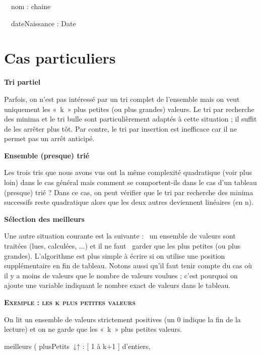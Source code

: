 {\sffamily
\ \ nom : chaine}

{\sffamily
\ \ dateNaissance : Date}

{\sffamily
{} }


\bigskip

\section{Cas particuliers}
{\sffamily\bfseries\upshape
Tri partiel}

{
Parfois, on n’est pas intéressé par un tri complet de l’ensemble mais on
veut uniquement les «~k~» plus petites (ou plus grandes) valeurs. Le
tri par recherche des minima et le tri bulle sont particulièrement
adaptés à cette situation ; il suffit de les arrêter plus tôt. Par
contre, le tri par insertion est inefficace car il ne permet pas un
arrêt anticipé.}

{\sffamily\bfseries\upshape
Ensemble (presque) trié}

{
Les trois tris que nous avons vus ont la même complexité quadratique
(voir plus loin) dans le cas général mais comment se comportent-ils
dans le cas d’un tableau (presque) trié ? Dans ce cas, on peut vérifier
que le tri par recherche des minima successifs reste quadratique alors
que les deux autres deviennent linéaires (en n).}

{\sffamily\bfseries\upshape
Sélection des meilleurs}

{
Une autre situation courante est la suivante : \ un ensemble de valeurs
sont traitées (lues, calculées, ...) et il ne faut \ garder que les
 plus petites (ou plus grandes).
L'algorithme est plus simple à écrire si on utilise
une position supplémentaire en fin de tableau. Notons aussi qu’il faut
tenir compte du cas où il y a moins de valeurs que le nombre de valeurs
voulues ; c’est pourquoi on ajoute une variable indiquant le nombre
exact de valeurs dans le tableau.}

{\sffamily\bfseries\scshape
Exemple : les k plus petites valeurs}

{
On lit un ensemble de valeurs strictement positives (un 0 indique la fin
de la lecture) et on ne garde que les «~k~» plus petites valeurs.}


\bigskip


\bigskip

{\sffamily
{} meilleurs ( plusPetits~↓↑ :
 [ 1 à k+1 ] d’entiers, }

